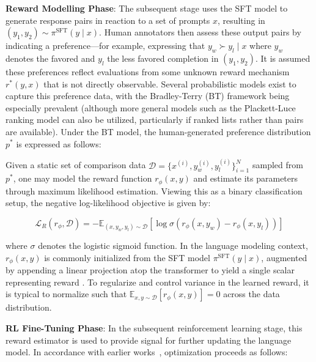 \textbf{Reward Modelling Phase}: The subsequent stage uses the SFT model to generate response pairs in reaction to a set of prompts $x$, resulting in $(y_1, y_2)\sim \pi^\text{SFT}(y \mid x)$. Human annotators then assess these output pairs by indicating a preference—for example, expressing that $y_w\succ y_l \mid x$ where $y_w$ denotes the favored and $y_l$ the less favored completion in $(y_1, y_2)$. It is assumed these preferences reflect evaluations from some unknown reward mechanism $r^*(y, x)$ that is not directly observable. Several probabilistic models exist to capture this preference data, with the Bradley-Terry (BT) \cite{bradley1952rankanalysis} framework being especially prevalent (although more general models such as the Plackett-Luce ranking model \citep{plackett1975analysis, luce2012individual} can also be utilized, particularly if ranked lists rather than pairs are available). Under the BT model, the human-generated preference distribution $p^*$ is expressed as follows:

Given a static set of comparison data $\mathcal{D}=\bigl\{x^{(i)}, y_w^{(i)}, y_l^{(i)}\bigr\}_{i=1}^N$ sampled from $p^*$, one may model the reward function $r_{\phi}(x, y)$ and estimate its parameters through maximum likelihood estimation. Viewing this as a binary classification setup, the negative log-likelihood objective is given by:

\begin{equation}\label{eq:reward_model}
    \mathcal{L}_R(r_{\phi}, \mathcal{D}) = -\mathbb{E}_{(x, y_w, y_l)\sim \mathcal{D}}\left[\log \sigma(r_{\phi}(x, y_w) - r_{\phi}(x, y_l))\right]
\end{equation}

where $\sigma$ denotes the logistic sigmoid function. In the language modeling context, $r_{\phi}(x, y)$ is commonly initialized from the SFT model $\pi^\text{SFT}(y \mid x)$, augmented by appending a linear projection atop the transformer to yield a single scalar representing reward \cite{ziegler2020finetuning}. To regularize and control variance in the learned reward, it is typical to normalize such that $\mathbb{E}_{x,y\sim \mathcal{D}}[r_{\phi}(x, y)] = 0$ across the data distribution.

\textbf{RL Fine-Tuning Phase}: In the subsequent reinforcement learning stage, this reward estimator is used to provide signal for further updating the language model. In accordance with earlier works~\citep{jaques2017sequence, jaques2020human}, optimization proceeds as follows:

